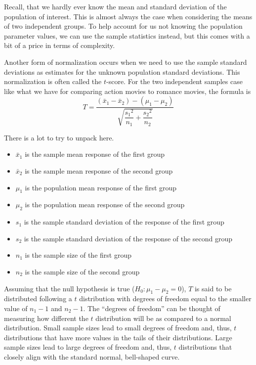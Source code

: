 \documentclass[12pt,]{krantz}
\providecommand{\tightlist}{%
  \setlength{\itemsep}{0pt}\setlength{\parskip}{0pt}}
\theoremstyle{definition}
\theoremstyle{definition}
\theoremstyle{definition}
\theoremstyle{remark}
\begin{document}
Recall, that we hardly ever know the mean and standard deviation of the
population of interest. This is almost always the case when considering
the means of two independent groups. To help account for us not knowing
the population parameter values, we can use the sample statistics
instead, but this comes with a bit of a price in terms of complexity.

Another form of normalization occurs when we need to use the sample
standard deviations as estimates for the unknown population standard
deviations. This normalization is often called the \(t\)-score. For the
two independent samples case like what we have for comparing action
movies to romance movies, the formula is
\[T =\dfrac{ (\bar{x}_1 - \bar{x}_2) - (\mu_1 - \mu_2)}{ \sqrt{\dfrac{{s_1}^2}{n_1} + \dfrac{{s_2}^2}{n_2}}  }\]

There is a lot to try to unpack here.

\begin{itemize}
\tightlist
\item
  \(\bar{x}_1\) is the sample mean response of the first group
\item
  \(\bar{x}_2\) is the sample mean response of the second group
\item
  \(\mu_1\) is the population mean response of the first group
\item
  \(\mu_2\) is the population mean response of the second group
\item
  \(s_1\) is the sample standard deviation of the response of the first
  group
\item
  \(s_2\) is the sample standard deviation of the response of the second
  group
\item
  \(n_1\) is the sample size of the first group
\item
  \(n_2\) is the sample size of the second group
\end{itemize}

Assuming that the null hypothesis is true (\(H_0: \mu_1 - \mu_2 = 0\)),
\(T\) is said to be distributed following a \(t\) distribution with
degrees of freedom equal to the smaller value of \(n_1 - 1\) and
\(n_2 - 1\). The ``degrees of freedom'' can be thought of measuring how
different the \(t\) distribution will be as compared to a normal
distribution. Small sample sizes lead to small degrees of freedom and,
thus, \(t\) distributions that have more values in the tails of their
distributions. Large sample sizes lead to large degrees of freedom and,
thus, \(t\) distributions that closely align with the standard normal,
bell-shaped curve.
\end{document}
